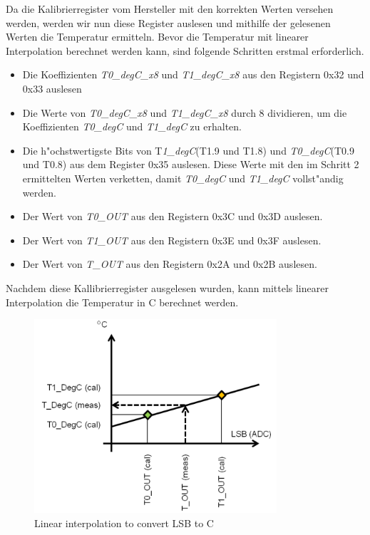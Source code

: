 Da die Kalibrierregister vom Hersteller mit den korrekten Werten 
versehen werden, werden wir nun diese Register auslesen und mithilfe der 
gelesenen Werten die Temperatur ermitteln. Bevor die Temperatur 
mit linearer Interpolation berechnet werden kann, sind folgende Schritten 
erstmal erforderlich.

\begin{itemize}
	\item Die Koeffizienten \textit{T0\_degC\_x8} und 
	\textit{T1\_degC\_x8} aus den Registern 0x32 und 0x33 auslesen
	\item Die Werte von \textit{T0\_degC\_x8} und \textit{T1\_degC\_x8} 
	durch 8 dividieren, um die Koeffizienten \textit{T0\_degC} und 
	\textit{T1\_degC} zu erhalten.
	\item Die h"ochstwertigste Bits von T\textit{1\_degC}(T1.9 und T1.8) 
	und \textit{T0\_degC}(T0.9 und T0.8) aus dem Register 0x35 auslesen. 
	Diese Werte mit den im Schritt 2 ermittelten Werten verketten, damit 
	\textit{T0\_degC} und \textit{T1\_degC} vollst"andig werden.
	\item Der Wert von \textit{T0\_OUT} aus den Registern 0x3C und 0x3D 
	auslesen.
	\item Der Wert von \textit{T1\_OUT} aus den Registern 0x3E und 0x3F 
	auslesen.
	\item Der Wert von \textit{T\_OUT} aus den Registern 0x2A und 0x2B 
	auslesen.
	 	
\end{itemize}

Nachdem diese Kallibrierregister ausgelesen wurden, kann mittels 
linearer Interpolation die Temperatur in \textdegree{}C berechnet werden.

\begin{figure}[h]
	\centering
	\includegraphics[width=9cm]{source/images/Temp}
	\caption{Linear interpolation to convert LSB to \textdegree{}C 
	\cite{HTS221}}\label{fig:T}
\end{figure}

